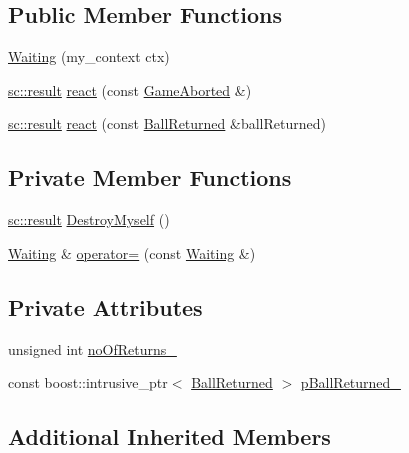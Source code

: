 \subsection*{Public Member Functions}
\begin{DoxyCompactItemize}
\item 
\mbox{\hyperlink{struct_waiting_a0c0fb756d46782ff26b8faa3ce80defc}{Waiting}} (my\+\_\+context ctx)
\item 
\mbox{\hyperlink{namespaceboost_1_1statechart_abe807f6598b614d6d87bb951ecd92331}{sc\+::result}} \mbox{\hyperlink{struct_waiting_afb8322d5f8e33ef42f20a904095afe3d}{react}} (const \mbox{\hyperlink{struct_game_aborted}{Game\+Aborted}} \&)
\item 
\mbox{\hyperlink{namespaceboost_1_1statechart_abe807f6598b614d6d87bb951ecd92331}{sc\+::result}} \mbox{\hyperlink{struct_waiting_a8c34737a1eb91381c14fb9647958f41b}{react}} (const \mbox{\hyperlink{struct_ball_returned}{Ball\+Returned}} \&ball\+Returned)
\end{DoxyCompactItemize}
\subsection*{Private Member Functions}
\begin{DoxyCompactItemize}
\item 
\mbox{\hyperlink{namespaceboost_1_1statechart_abe807f6598b614d6d87bb951ecd92331}{sc\+::result}} \mbox{\hyperlink{struct_waiting_a130dc49639541e8bc0bc04b8b81fc90f}{Destroy\+Myself}} ()
\item 
\mbox{\hyperlink{struct_waiting}{Waiting}} \& \mbox{\hyperlink{struct_waiting_a161ef2052a6de4dfc9189317db05b4e3}{operator=}} (const \mbox{\hyperlink{struct_waiting}{Waiting}} \&)
\end{DoxyCompactItemize}
\subsection*{Private Attributes}
\begin{DoxyCompactItemize}
\item 
unsigned int \mbox{\hyperlink{struct_waiting_a34e5cb3810b8c1c5199cd9a9d81b6480}{no\+Of\+Returns\+\_\+}}
\item 
const boost\+::intrusive\+\_\+ptr$<$ \mbox{\hyperlink{struct_ball_returned}{Ball\+Returned}} $>$ \mbox{\hyperlink{struct_waiting_a66aabb3e766408dec514b0a9ef6ac39e}{p\+Ball\+Returned\+\_\+}}
\end{DoxyCompactItemize}
\subsection*{Additional Inherited Members}


